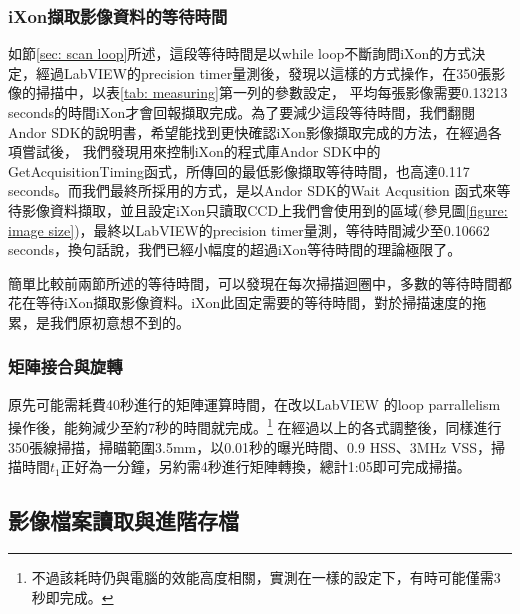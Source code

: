 \documentclass[12pt]{article}
\begin{document}
\subsubsection{iXon擷取影像資料的等待時間}
如節\ref{sec: scan loop}所述，這段等待時間是以while loop不斷詢問iXon的方式決定，經過LabVIEW的precision timer量測後，發現以這樣的方式操作，在350張影像的掃描中，以表\ref{tab: measuring}第一列的參數設定，
平均每張影像需要0.13213 seconds的時間iXon才會回報擷取完成。為了要減少這段等待時間，我們翻閱Andor SDK的說明書，希望能找到更快確認iXon影像擷取完成的方法，在經過各項嘗試後，
我們發現用來控制iXon的程式庫Andor SDK中的GetAcquisitionTiming函式，所傳回的最低影像擷取等待時間，也高達0.117 seconds。而我們最終所採用的方式，是以Andor SDK的Wait Acqusition
函式來等待影像資料擷取，並且設定iXon只讀取CCD上我們會使用到的區域(參見圖\ref{figure: image size})，最終以LabVIEW的precision timer量測，等待時間減少至0.10662 seconds，換句話說，我們已經小幅度的超過iXon等待時間的理論極限了。

簡單比較前兩節所述的等待時間，可以發現在每次掃描迴圈中，多數的等待時間都花在等待iXon擷取影像資料。iXon此固定需要的等待時間，對於掃描速度的拖累，是我們原初意想不到的。

\subsubsection{矩陣接合與旋轉}
原先可能需耗費40秒進行的矩陣運算時間，在改以LabVIEW 的loop parrallelism操作後，能夠減少至約7秒的時間就完成。\footnote{不過該耗時仍與電腦的效能高度相關，實測在一樣的設定下，有時可能僅需3秒即完成。}
在經過以上的各式調整後，同樣進行350張線掃描，掃瞄範圍3.5mm，以0.01秒的曝光時間、0.9 HSS、3MHz VSS，掃描時間$t_1$正好為一分鐘，另約需4秒進行矩陣轉換，總計1:05即可完成掃描。

\subsection{影像檔案讀取與進階存檔}
\end{document}
